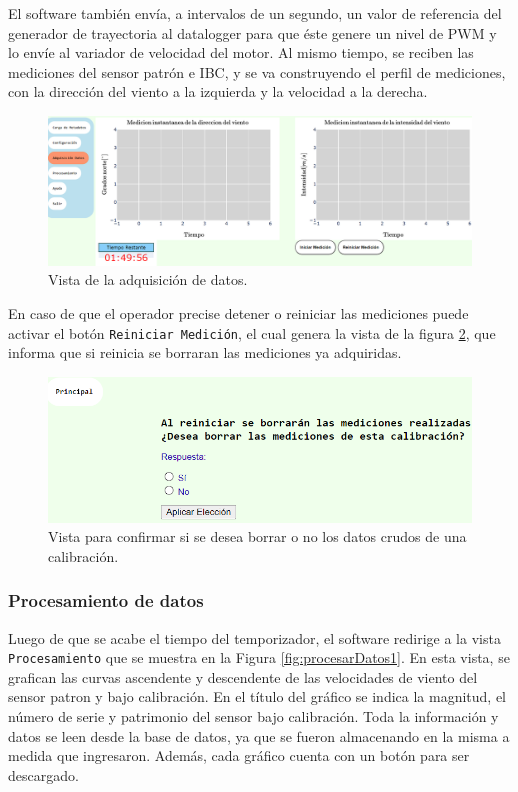 El software también envía, a intervalos de un segundo, un valor de referencia del generador de trayectoria al datalogger para que éste genere un nivel de PWM y lo envíe al variador de velocidad del motor. Al mismo tiempo, se reciben las mediciones del sensor patrón e IBC, y se va construyendo el perfil de mediciones, con la dirección del viento a la izquierda y la velocidad a la derecha.

\begin{figure}[H]
    \centering
    \includegraphics[width=1\linewidth]{Figuras/AplicacionWeb/frondend/adquisicionDatos.png}
    \caption{Vista de la adquisición de datos.}
    \label{fig:adquisicionDatos}
\end{figure}

En caso de que el operador precise detener o reiniciar las mediciones puede activar el botón \texttt{Reiniciar Medición}, el cual genera la vista de la figura \ref{fig:borrarMediciones}, que informa que si reinicia se borraran las mediciones ya adquiridas.

\begin{figure}[H]
    \centering
    \includegraphics[width=0.8\linewidth]{Figuras/AplicacionWeb/frondend/borrarMediciones.png}
    \caption{Vista para confirmar si se desea borrar o no los datos crudos de una calibración.}
    \label{fig:borrarMediciones}
\end{figure}



\subsubsection{Procesamiento de datos}\label{sec:ProcesamientoDatos}
Luego de que se acabe el tiempo del temporizador, el software redirige a la vista \texttt{Procesamiento} que se muestra en la Figura \ref{fig:procesarDatos1}. En esta vista, se grafican las curvas ascendente y descendente de las velocidades de viento del sensor patron y bajo calibración. En el título del gráfico se indica la magnitud, el número de serie y patrimonio del sensor bajo calibración. Toda la información y datos se leen desde la base de datos, ya que se fueron almacenando en la misma a medida que ingresaron. Además, cada gráfico cuenta con un botón para ser descargado.

